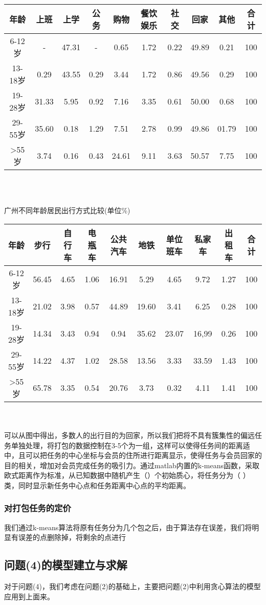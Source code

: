 \documentclass{ctexart}
\begin{document}
\begin{tabular}{|cccccccccc|}

\hline
年龄 &上班&上学&公务&购物&餐饮娱乐&社交&回家&其他&合计\\
\hline
6-12岁 &-&47.31&-&0.65&1.72&0.22&49.89&0.21&100\\
\hline
13-18岁 &0.29&43.55&0.29&3.44&1.72&0.86&49.56&0.29&100\\
\hline
19-28岁 &31.33&5.95&0.92&7.16&3.35&0.61&50.00&0.68&100\\
\hline
29-55岁 &35.60&0.18&1.29&7.51&2.78&0.99&49.86&01.79&100\\
\hline
>55岁 &3.74&0.16&0.43&24.61&9.11&3.63&50.57&7.75&100\\
\hline
\end{tabular}
\\
\\
\centerline{广州不同年龄居民出行方式比较(单位\%)}

\begin{tabular}{|cccccccccc|}

\hline
年龄 &步行&自行车&电瓶车&公共汽车&地铁&单位班车&私家车&出租车&合计\\
\hline
6-12岁 &56.45&4.65&1.06&16.91&5.29&4.65&9.72&1.27&100\\
\hline
13-18岁 &21.02&3.98&0.57&44.89&19.60&3.41&6.25&0.28&100\\
\hline
19-28岁 &14.34&3.43&0.94&0.94&35.62&23.07&16,99&0.26&100\\
\hline
29-55岁 &14.22&4.37&1.02&28.58&13.56&3.33&33.59&1.43&100\\
\hline
>55岁 &65.78&3.35&0.54&20.76&3.73&0.32&4.11&1.41&100\\
\hline
\end{tabular}
\\
\\
可以从图中得出，多数人的出行目的为回家，所以我们把将不具有簇集性的偏远任务单独处理，将打包的数据控制在3-5个为一组，这样可以使得任务间的距离适中，且可以把任务的中心坐标与会员的住所进行距离显示，使得任务与会员回家的目的相关，增加对会员完成任务的吸引力。通过matlab内置的k-means函数，采取欧式距离作为标准，从已知数据中随机产生（）个初始质心，将任务分为（ ）类，同时显示新任务中心点和任务距离中心点的平均距离。
\subsubsection{对打包任务的定价}
我们通过k-means算法将原有任务分为几个包之后，由于算法存在误差，我们将明显有误差的点删除掉，将剩余的点进行
\subsection{问题(4)的模型建立与求解}
对于问题(4)，我们考虑在问题(2)的基础上，主要把问题(2)中利用贪心算法的模型应用到上面来。
\end{document}
